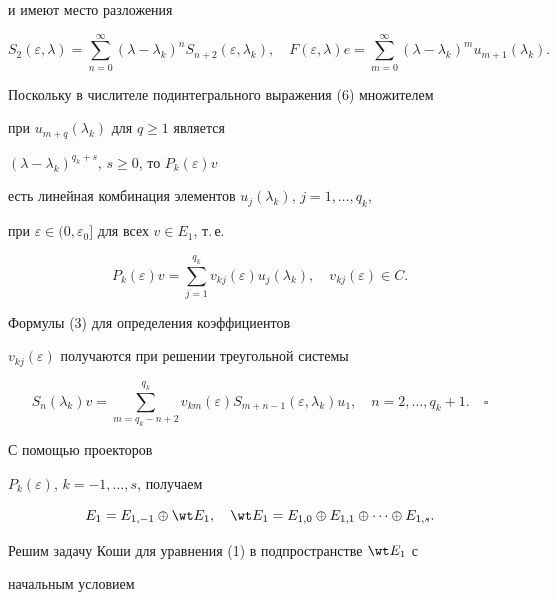 и имеют место разложения


\begin{equation}


S_2(\varepsilon, \lambda)=\sum_{n=0}^{\infty}(\lambda


-\lambda_k)^nS_{n+2}(\varepsilon, \lambda_k),\quad


F(\varepsilon, \lambda)e=


\sum_{m=0}^\infty(\lambda-\lambda_k)^mu_{m+1}(\lambda_k).


\end{equation}


Поскольку в числителе подинтегрального выражения (6) множителем


при $u_{m+q}( \lambda_k)$ для $q\ge1$ является


$(\lambda-\lambda_k)^{q_k+s}$, $s\ge0$, то $P_k(\varepsilon)v$


есть линейная комбинация элементов $u_j(\lambda_k)$, $j=1,\dots, q_k$,


при $\varepsilon\in(0,\varepsilon_0]$ для всех $v\in E_1$, т.\,е.


$$


P_k(\varepsilon)v=\sum_{j=1}^{q_k}v_{kj}(\varepsilon)u_j(\lambda_k), 


\quad v_{kj}( \varepsilon)\in C.


$$


Формулы (3) для определения коэффициентов


$v_{kj}(\varepsilon)$ получаются при решении треугольной системы


$$


S_n(\lambda_k)v=\sum_{m=q_k-n+2}^{q_k}v_{km}(\varepsilon)


S_{m+n-1}(\varepsilon, \lambda_k)u_1,\quad n=2, \dotsc,


q_k+1.\quad\square


$$





С помощью проекторов


$P_k(\varepsilon)$, $k=-1, \dotsc, s$, получаем


$$


E_1=E_{1,-1}\oplus \wt E_1, \quad


\wt E_1=E_{1,0}\oplus E_{1,1}\oplus\dotsb \oplus E_{1,s}.


$$


Решим задачу Коши для уравнения (1) в подпространстве $\wt E_1$ с


начальным условием


